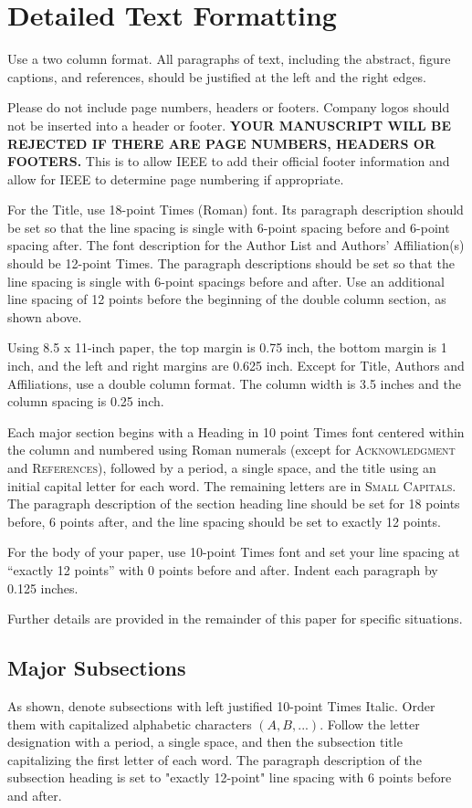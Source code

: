 \documentclass[conference]{pvsctran}
\begin{document}
\section{Detailed Text Formatting}
Use a two column format.  All paragraphs of text, including the abstract, figure captions, and references, should be justified at the left and the right edges.

Please do not include page numbers, headers or footers.  Company logos should not be inserted into a header or footer.  \textbf{YOUR MANUSCRIPT WILL BE REJECTED IF THERE ARE PAGE NUMBERS, HEADERS OR FOOTERS.}  This is to allow IEEE to add their official footer information and allow for IEEE to determine page numbering if appropriate.

For the Title, use 18-point Times (Roman) font. Its paragraph description should be set so that the line spacing is single with 6-point spacing before and 6-point spacing after. The font description for the Author List and Authors' Affiliation(s) should be 12-point Times. The paragraph descriptions should be set so that the line spacing is single with 6-point spacings before and after. Use an additional line spacing of 12 points before the beginning of the double column section, as shown above.

Using 8.5 x 11-inch paper, the top margin is 0.75 inch, the bottom margin is 1 inch, and the left and right margins are
0.625 inch. Except for Title, Authors and Affiliations, use a double column format. The column width is 3.5 inches and the column spacing is 0.25 inch.

Each major section begins with a Heading in 10 point Times font centered within the column and numbered using Roman numerals (except for \textsc{Acknowledgment} and \textsc{References}), followed by a period, a single space, and the title using an initial capital letter for each word. The remaining letters are in \textsc{Small Capitals}. The paragraph description of the section heading line should be set for 18 points before, 6 points after, and the line spacing should be set to exactly 12 points.

For the body of your paper, use 10-point Times font and set your line spacing at ``exactly 12 points'' with 0 points before and after. Indent each paragraph by 0.125 inches. 

Further details are provided in the remainder of this paper for specific situations.

\subsection{ Major Subsections}
As shown, denote subsections with left justified 10-point Times Italic. Order them with capitalized alphabetic characters $(A, B,...)$. Follow the letter designation with a period, a single space, and then the subsection title capitalizing the first letter of each word. The paragraph description of the subsection heading is set to "exactly 12-point" line spacing with 6 points before and after.
\end{document}
